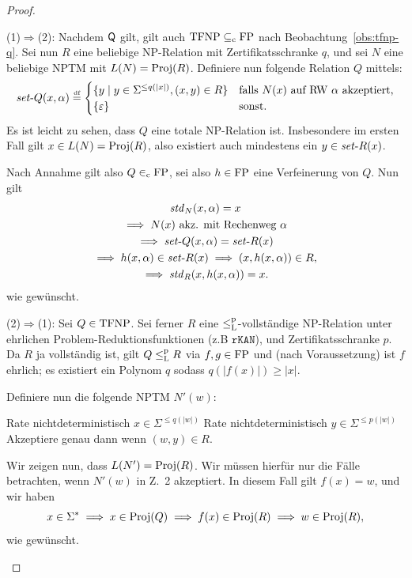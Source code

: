 \begin{proof}
\begin{prooflist}
\item (1)$\Rightarrow$(2): 
    Nachdem $\mathsf{Q}$ gilt, gilt auch $\mathrm{TFNP}\subseteq_\mathrm{c}\mathrm{FP}$ nach Beobachtung~\ref{obs:tfnp-q}.
    Sei nun $R$ eine beliebige NP-Relation mit Zertifikatsschranke $q$, und
    sei $N$ eine beliebige NPTM mit $L(N)=\operatorname{Proj}(R)$. 
    Definiere nun folgende Relation $Q$ mittels:
    \[ \mathit{set}\text{-}{}Q(x, \alpha) \stackrel{\text{\smash{\tiny df}}}{=}  \begin{cases} \{ y\mid y\in\Sigma^{\leq q(|x|)}, (x,y)\in R \} & \text{falls $N(x)$ auf RW $\alpha$ akzeptiert,} \\\{\varepsilon\} & \text{sonst.} \end{cases}\]
    Es ist leicht zu sehen, dass $Q$ eine totale NP-Relation ist. Insbesondere im ersten Fall gilt $x\in L(N)=\operatorname{Proj}(R)$, also existiert auch mindestens ein $y\in\mathit{set}\text{-}{}R(x)$.

    Nach Annahme gilt also $Q\in_\mathrm{c}\mathrm{FP}$, sei also $h\in\mathrm{FP}$ eine Verfeinerung von $Q$.
    Nun gilt
    \begin{gather*}
        \mathit{std}_N(x,\alpha)=x\\
        \implies N(x) \text{ akz. mit Rechenweg $\alpha$}\\
        \implies \mathit{set}\text{-}{}Q(x,\alpha) = \mathit{set}\text{-}{}R(x)\\
        \implies h(x,\alpha) \in \mathit{set}\text{-}{}R(x) \implies (x, h(x,\alpha))\in R,\\
        \implies \mathit{std}_R(x, h(x,\alpha))=x.
    \end{gather*}
    wie gewünscht.

\item (2)$\Rightarrow$(1): 
    Sei $Q\in\mathrm{TFNP}$. 
    Sei ferner $R$ eine $\leq_\mathrm{L}^\mathrm{p}$-vollständige NP-Relation unter ehrlichen Problem-Reduktionsfunktionen (z.B $\mathtt{rKAN}$), und Zertifikatsschranke $p$.
    Da $R$ ja vollständig ist, gilt $Q\leq_\mathrm{L}^\mathrm{p} R$ via $f,g\in\mathrm{FP}$ und (nach Voraussetzung) ist $f$ ehrlich; es existiert ein Polynom $q$ sodass $q(|f(x)|)\geq |x|$.

    Definiere nun die folgende NPTM $N'(w)$:\\%
    \begin{algorithm}[H]
        Rate nichtdeterministisch $x\in \Sigma^{\leq q(|w|)}$\;
        Rate nichtdeterministisch $y\in \Sigma^{\leq p(|w|)}$\;
        Akzeptiere genau dann wenn $(w,y)\in R$.
    \end{algorithm}
    Wir zeigen nun, dass $L(N')=\operatorname{Proj}(R)$. Wir müssen hierfür nur die Fälle betrachten, wenn $N'(w)$ in Z.~2 akzeptiert.
    In diesem Fall gilt $f(x)=w$, und wir haben
    \[ x\in\Sigma^* \implies x\in\operatorname{Proj}(Q) \implies f(x)\in\operatorname{Proj}(R) \implies w\in\operatorname{Proj}(R), \]
    wie gewünscht.


\end{prooflist}
\end{proof}
